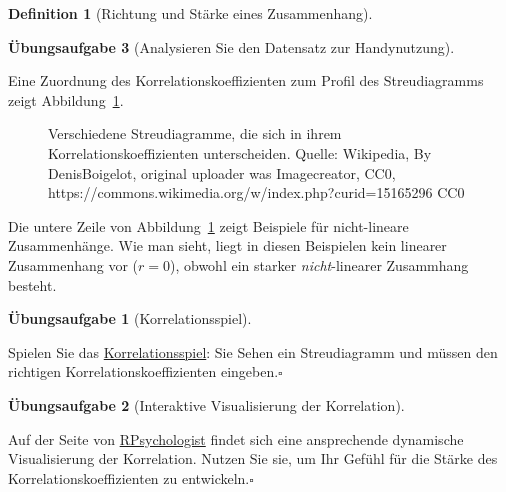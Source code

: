 \documentclass[
  a4paper,
  DIV=11]{scrreprt}
\theoremstyle{definition}
\newtheorem{exercise}{Übungsaufgabe}[chapter]
\theoremstyle{definition}
\theoremstyle{definition}
\newtheorem{definition}{Definition}[chapter]
\theoremstyle{remark}
\begin{document}
\begin{definition}[Richtung und Stärke eines
Zusammenhang]
\begin{exercise}[Analysieren Sie den Datensatz zur
Handynutzung]
\begin{tcolorbox}
\end{tcolorbox}


Eine Zuordnung des Korrelationskoeffizienten zum Profil des
Streudiagramms zeigt Abbildung~\ref{fig-corr-wiki}.

\begin{figure}


\caption{\label{fig-corr-wiki}Verschiedene Streudiagramme, die sich in
ihrem Korrelationskoeffizienten unterscheiden. Quelle: Wikipedia, By
DenisBoigelot, original uploader was Imagecreator, CC0,
https://commons.wikimedia.org/w/index.php?curid=15165296 CC0}

\end{figure}%

Die untere Zeile von Abbildung~\ref{fig-corr-wiki} zeigt Beispiele für
nicht-lineare Zusammenhänge. Wie man sieht, liegt in diesen Beispielen
kein linearer Zusammenhang vor (\(r=0\)), obwohl ein starker
\emph{nicht}-linearer Zusammhang besteht.

\begin{exercise}[Korrelationsspiel]\protect\hypertarget{exr-corrgame}{}\label{exr-corrgame}

Spielen Sie das
\href{https://gallery.shinyapps.io/correlation_game/}{Korrelationsspiel}:
Sie Sehen ein Streudiagramm und müssen den richtigen
Korrelationskoeffizienten eingeben.\(\square\)

\end{exercise}

\begin{exercise}[Interaktive Visualisierung der
Korrelation]\protect\hypertarget{exr-corrvis}{}\label{exr-corrvis}

Auf der Seite von
\href{https://rpsychologist.com/correlation/}{RPsychologist} findet sich
eine ansprechende dynamische Visualisierung der Korrelation. Nutzen Sie
sie, um Ihr Gefühl für die Stärke des Korrelationskoeffizienten zu
entwickeln.\(\square\)


\end{exercise}
\end{exercise}
\end{definition}
\end{document}
